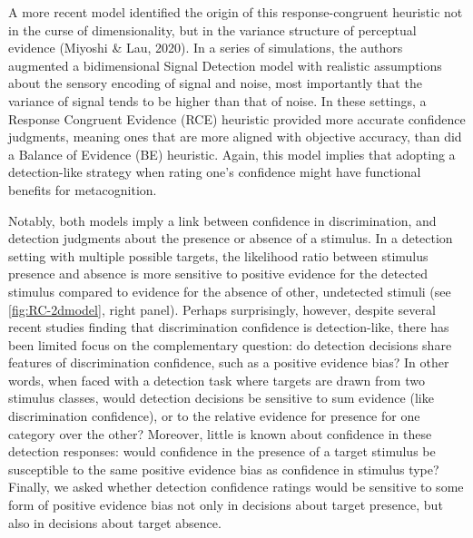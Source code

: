 \documentclass[12pt,twoside]{reedthesis}
\begin{document}
A more recent model identified the origin of this response-congruent heuristic not in the curse of dimensionality, but in the variance structure of perceptual evidence (Miyoshi \& Lau, 2020). In a series of simulations, the authors augmented a bidimensional Signal Detection model with realistic assumptions about the sensory encoding of signal and noise, most importantly that the variance of signal tends to be higher than that of noise. In these settings, a Response Congruent Evidence (RCE) heuristic provided more accurate confidence judgments, meaning ones that are more aligned with objective accuracy, than did a Balance of Evidence (BE) heuristic. Again, this model implies that adopting a detection-like strategy when rating one's confidence might have functional benefits for metacognition.

Notably, both models imply a link between confidence in discrimination, and detection judgments about the presence or absence of a stimulus. In a detection setting with multiple possible targets, the likelihood ratio between stimulus presence and absence is more sensitive to positive evidence for the detected stimulus compared to evidence for the absence of other, undetected stimuli (see \ref{fig:RC-2dmodel}, right panel). Perhaps surprisingly, however, despite several recent studies finding that discrimination confidence is detection-like, there has been limited focus on the complementary question: do detection decisions share features of discrimination confidence, such as a positive evidence bias? In other words, when faced with a detection task where targets are drawn from two stimulus classes, would detection decisions be sensitive to sum evidence (like discrimination confidence), or to the relative evidence for presence for one category over the other? Moreover, little is known about confidence in these detection responses: would confidence in the presence of a target stimulus be susceptible to the same positive evidence bias as confidence in stimulus type? Finally, we asked whether detection confidence ratings would be sensitive to some form of positive evidence bias not only in decisions about target presence, but also in decisions about target absence.
\end{document}
